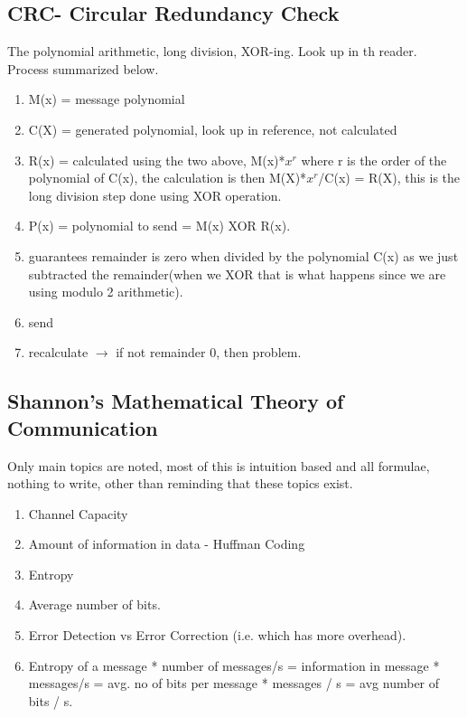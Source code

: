\documentclass[12pt]{book}
\begin{document}
\subsection{CRC- Circular Redundancy Check}
The polynomial arithmetic, long division, XOR-ing. Look up in th reader. Process summarized below.
\begin{enumerate}
    \item M(x) = message polynomial
    \item C(X) = generated polynomial, look up in reference, not calculated
    \item R(x) = calculated using the two above, M(x)*$x^{r}$ where r is the order of the polynomial of C(x), the calculation is then M(X)*$x^{r}$/C(x) = R(X), this is the long division step done using XOR operation.
    \item P(x) = polynomial to send = M(x) XOR R(x).
    \item guarantees remainder is zero when divided by the polynomial C(x) as we just subtracted the remainder(when we XOR that is what happens since we are using modulo 2 arithmetic).
    \item send
    \item recalculate $\to$ if not remainder 0, then problem.
\end{enumerate}
\subsection{Shannon's Mathematical Theory of Communication}
Only main topics are noted, most of this is intuition based and all formulae, nothing to write, other than reminding that these topics exist.
\begin{enumerate}
    \item Channel Capacity
    \item Amount of information in data - Huffman Coding
    \item Entropy
    \item Average number of bits.
    \item Error Detection vs Error Correction (i.e. which has more overhead).
    \item Entropy of a message * number of messages/s = information in message * messages/s = avg. no of bits per message * messages / s = avg number of bits / s.
\end{enumerate}
\end{document}

